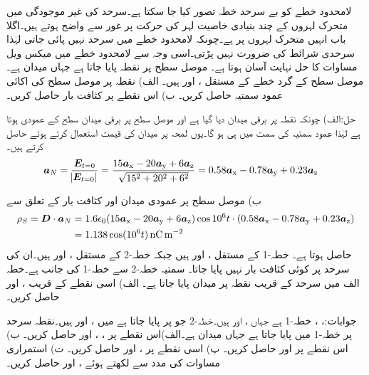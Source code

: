 لامحدود خطے کو بے سرحد خطہ تصور کیا جا سکتا ہے۔سرحد کی غیر موجودگی میں متحرک لہروں کے چند بنیادی خاصیت لہر کی حرکت پر غور سے واضح ہوتے ہیں۔اگلا باب انہیں متحرک لہروں پر ہے۔چونکہ لامحدود خطے میں سرحد نہیں پائی جاتی لہٰذا سرحدی شرائط کی ضرورت نہیں پڑتی۔اسی وجہ سے لامحدود خطے میں میکس ویل مساوات کا حل نہایت آسان ہوتا ہے۔ 
موصل سطح پر نقطہ  پایا جاتا ہے جہاں میدان  ہے۔موصل سطح کے گرد خطے کے مستقل ،  اور  ہیں۔ الف) نقطہ  پر موصل سطح کی  اکائی  عمود سمتیہ  حاصل کریں۔ ب) اس نقطے پر کثافت بار حاصل کریں۔

حل:الف) چونکہ نقطہ  پر برقی میدان دیا گیا ہے اور موصل سطح پر برقی میدان سطح کے عمودی ہوتا ہے لہٰذا عمود سمتیہ  کی سمت میں ہی ہو گا۔یوں لمحہ  پر میدان کی قیمت استعمال کرتے ہوئے  حاصل کرتے ہیں۔
\begin{align*}
{\boldsymbol{a}}_N=\frac{{{\boldsymbol{E}}}_{t=0}}{\abs{{{\boldsymbol{E}}}_{t=0}}}&=\frac{15{\boldsymbol{a}}_{\textup{x}}-20{\boldsymbol{a}}_{\textup{y}}+6{\boldsymbol{a}}_{\textup{z}} }{\sqrt{15^2+20^2+6^2}}=0.58{\boldsymbol{a}}_{\textup{x}}-0.78{\boldsymbol{a}}_{\textup{y}}+0.23{\boldsymbol{a}}_{\textup{z}}
\end{align*}

ب) موصل سطح پر عمودی میدان اور کثافت بار کے تعلق سے
\begin{align*}
\rho_S={{\boldsymbol{D}}} \cdot {\boldsymbol{a}}_N&=1.6\epsilon_0 (15{\boldsymbol{a}}_{\textup{x}}-20{\boldsymbol{a}}_{\textup{y}}+6{\boldsymbol{a}}_{\textup{z}})\cos 10^6 t \cdot (0.58{\boldsymbol{a}}_{\textup{x}}-0.78{\boldsymbol{a}}_{\textup{y}}+0.23{\boldsymbol{a}}_{\textup{z}})\\
&=1.138 \cos(10^6 t) \, \si{\nano \coulomb \per\meter\squared}
\end{align*}
حاصل ہوتا ہے۔
خطہ-1 کے مستقل ،  اور  ہیں جبکہ خطہ-2 کے مستقل ،  اور  ہیں۔ان کی سرحد پر کوئی کثافت بار نہیں پایا جاتا۔ سمتیہ  خطہ-2 سے خطہ-1 کی جانب ہے۔خطہ الف میں سرحد کے قریب نقطہ  پر میدان  پایا جاتا ہے۔ الف) اسی نقطے کے قریب ،  اور  حاصل کریں۔

جوابات:، ، 
 خطہ-1 ہے جہاں ،  اور  ہیں۔خطہ-2 جو  پر پایا جاتا ہے میں ، 
 اور  ہیں۔نقطہ  سرحد پر خطہ-1 میں پایا جاتا ہے جہاں میدان
  ہے۔الف)اس نقطے پر ، ،  اور  حاصل کریں۔ ب) اس نقطے پر  اور  حاصل کریں۔ پ) اسی نقطے پر ،  اور  حاصل کریں۔ ت) استمراری مساوات کی مدد
 سے  لکھتے ہوئے ،  اور  حاصل کریں۔

